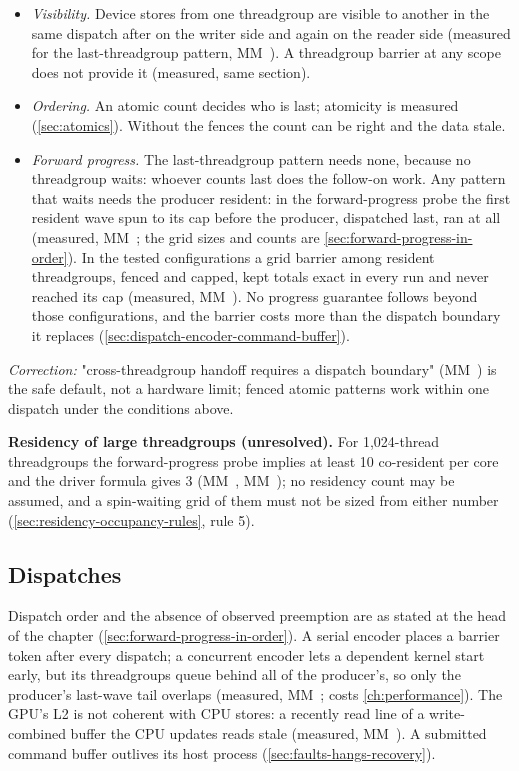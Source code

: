 \begin{itemize}
\item \emph{Visibility.} Device stores from one threadgroup are visible to another in the same dispatch after 
  on the writer side and again on the reader side (measured for the last-threadgroup pattern, MM~). A threadgroup
  barrier at any scope does not provide it (measured, same section).
\item \emph{Ordering.} An atomic count decides who is last; atomicity is measured (\cref{sec:atomics}). Without the fences the count can be
  right and the data stale.
\item \emph{Forward progress.} The last-threadgroup pattern needs none, because no threadgroup waits: whoever counts last does the
  follow-on work. Any pattern that waits needs the producer resident: in the forward-progress probe the first resident
  wave spun to its cap before the producer, dispatched last, ran at all (measured, MM~; the grid sizes and counts
  are \cref{sec:forward-progress-in-order}). In the tested configurations a grid barrier among resident threadgroups, fenced and capped, kept
  totals exact in every run and never reached its cap (measured, MM~). No progress guarantee follows
  beyond those configurations, and the barrier costs more than the dispatch boundary it replaces (\cref{sec:dispatch-encoder-command-buffer}).
\end{itemize}

\emph{Correction:} "cross-threadgroup handoff requires a dispatch boundary" (MM~) is the safe default, not a hardware
limit; fenced atomic patterns work within one dispatch under the conditions above.

\textbf{Residency of large threadgroups (unresolved).} For 1,024-thread threadgroups the forward-progress probe implies at least
10 co-resident per core and the driver formula gives 3 (MM~, MM~); no residency count may be assumed, and
a spin-waiting grid of them must not be sized from either number (\cref{sec:residency-occupancy-rules}, rule 5).

\subsection*{Dispatches}

Dispatch order and the absence of observed preemption are as stated at the head of the chapter
(\cref{sec:forward-progress-in-order}). A serial encoder places
a barrier token after every dispatch; a concurrent encoder lets a dependent kernel start early, but its threadgroups queue
behind all of the producer's, so only the producer's last-wave tail overlaps (measured, MM~; costs \cref{ch:performance}).
The GPU's L2 is not coherent with CPU stores: a recently read line of a write-combined buffer the CPU updates reads stale
(measured, MM~). A submitted command buffer outlives its host process (\cref{sec:faults-hangs-recovery}).

